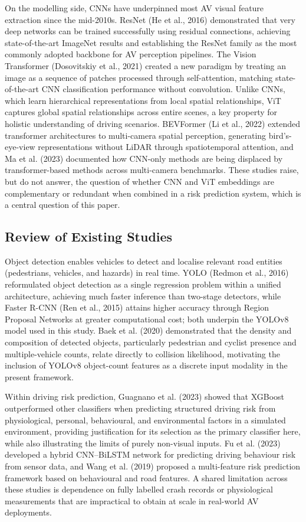 \documentclass[11pt,a4paper]{article}
\begin{document}
On the modelling side, CNNs have underpinned most AV visual feature extraction since the mid-2010s. ResNet (He et al., 2016) demonstrated that very deep networks can be trained successfully using residual connections, achieving state-of-the-art ImageNet results and establishing the ResNet family as the most commonly adopted backbone for AV perception pipelines. The Vision Transformer (Dosovitskiy et al., 2021) created a new paradigm by treating an image as a sequence of patches processed through self-attention, matching state-of-the-art CNN classification performance without convolution. Unlike CNNs, which learn hierarchical representations from local spatial relationships, ViT captures global spatial relationships across entire scenes, a key property for holistic understanding of driving scenarios. BEVFormer (Li et al., 2022) extended transformer architectures to multi-camera spatial perception, generating bird's-eye-view representations without LiDAR through spatiotemporal attention, and Ma et al. (2023) documented how CNN-only methods are being displaced by transformer-based methods across multi-camera benchmarks. These studies raise, but do not answer, the question of whether CNN and ViT embeddings are complementary or redundant when combined in a risk prediction system, which is a central question of this paper.

\subsection{Review of Existing Studies}

Object detection enables vehicles to detect and localise relevant road entities (pedestrians, vehicles, and hazards) in real time. YOLO (Redmon et al., 2016) reformulated object detection as a single regression problem within a unified architecture, achieving much faster inference than two-stage detectors, while Faster R-CNN (Ren et al., 2015) attains higher accuracy through Region Proposal Networks at greater computational cost; both underpin the YOLOv8 model used in this study. Baek et al. (2020) demonstrated that the density and composition of detected objects, particularly pedestrian and cyclist presence and multiple-vehicle counts, relate directly to collision likelihood, motivating the inclusion of YOLOv8 object-count features as a discrete input modality in the present framework.

Within driving risk prediction, Guagnano et al. (2023) showed that XGBoost outperformed other classifiers when predicting structured driving risk from physiological, personal, behavioural, and environmental factors in a simulated environment, providing justification for its selection as the primary classifier here, while also illustrating the limits of purely non-visual inputs. Fu et al. (2023) developed a hybrid CNN--BiLSTM network for predicting driving behaviour risk from sensor data, and Wang et al. (2019) proposed a multi-feature risk prediction framework based on behavioural and road features. A shared limitation across these studies is dependence on fully labelled crash records or physiological measurements that are impractical to obtain at scale in real-world AV deployments.
\end{document}
